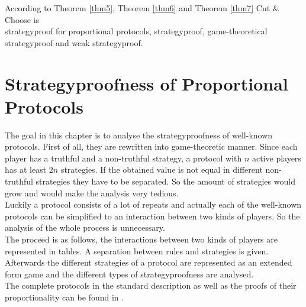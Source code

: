 \begin{bezeichnungen}
According to Theorem \ref{thm5}, Theorem \ref{thm6} and Theorem \ref{thm7} Cut $\&$ Choose is\\strategyproof for proportional protocols, strategyproof, game-theoretical strategyproof and weak strategyproof.
\end{bezeichnungen}
\pagebreak
\section{Strategyproofness of Proportional Protocols}
The goal in this chapter is to analyse the strategyproofness of well-known protocols. First of all, they are rewritten into game-theoretic manner. Since each player has a truthful and a non-truthful strategy, a protocol with $n$ active players has at least $2n$ strategies. If the obtained value is not equal in different non-truthful strategies they have to be separated. So the amount of strategies would grow and would make the analysis very tedious.\\Luckily a protocol consists of a lot of repeats and actually each of the well-known protocols can be simplified to an interaction between two kinds of players. So the analysis of the whole process is unnecessary.\\
The proceed is as follows, the interactions between two kinds of players are represented in tables. A separation between rules and strategies is given. Afterwards the different strategies of a protocol are represented as an extended form game and the different types of strategyproofness are analysed.\\
The complete protocols in the standard description as well as the proofs of their proportionality can be found in \cite{robertson:cake-cutting}.
